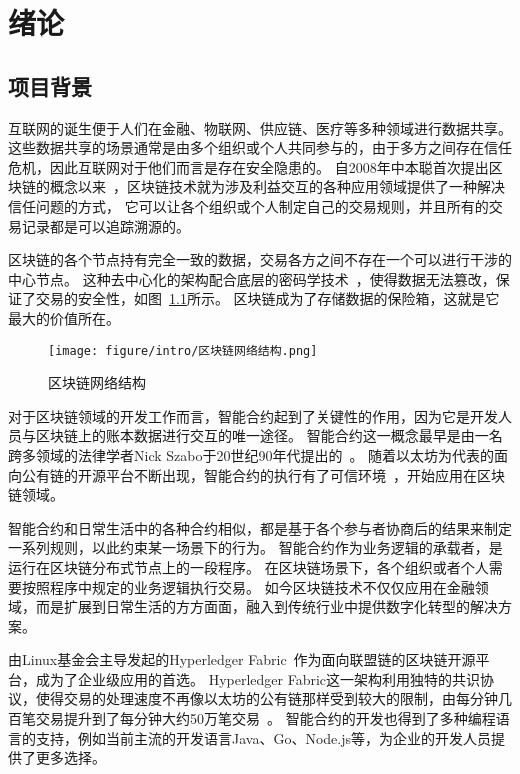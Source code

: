 \chapter{绪论}

\section{项目背景}

互联网的诞生便于人们在金融、物联网、供应链、医疗等多种领域进行数据共享。
这些数据共享的场景通常是由多个组织或个人共同参与的，由于多方之间存在信任危机，因此互联网对于他们而言是存在安全隐患的。
自2008年中本聪首次提出区块链的概念以来~\cite{Bitcoin}，区块链技术就为涉及利益交互的各种应用领域提供了一种解决信任问题的方式，
它可以让各个组织或个人制定自己的交易规则，并且所有的交易记录都是可以追踪溯源的。

区块链的各个节点持有完全一致的数据，交易各方之间不存在一个可以进行干涉的中心节点。
这种去中心化的架构配合底层的密码学技术~\cite{2016区块链技术发展现状与展望}，使得数据无法篡改，保证了交易的安全性，如图~\ref{fig:1.1}所示。
区块链成为了存储数据的保险箱，这就是它最大的价值所在。

\begin{figure}[htb]
  \centering
  \texttt{[image: figure/intro/区块链网络结构.png]}
  \caption{区块链网络结构}\label{fig:1.1}
\end{figure}

对于区块链领域的开发工作而言，智能合约起到了关键性的作用，因为它是开发人员与区块链上的账本数据进行交互的唯一途径。
智能合约这一概念最早是由一名跨多领域的法律学者Nick Szabo于20世纪90年代提出的~\cite{王春宇2016智能合约与金融合约}。
随着以太坊为代表的面向公有链的开源平台不断出现，智能合约的执行有了可信环境~\cite{QianYang}，开始应用在区块链领域。

智能合约和日常生活中的各种合约相似，都是基于各个参与者协商后的结果来制定一系列规则，以此约束某一场景下的行为。
智能合约作为业务逻辑的承载者，是运行在区块链分布式节点上的一段程序。
在区块链场景下，各个组织或者个人需要按照程序中规定的业务逻辑执行交易。
如今区块链技术不仅仅应用在金融领域，而是扩展到日常生活的方方面面，融入到传统行业中提供数字化转型的解决方案。

由Linux基金会主导发起的Hyperledger Fabric~\cite{Dhillon}作为面向联盟链的区块链开源平台，成为了企业级应用的首选。
Hyperledger Fabric这一架构利用独特的共识协议，使得交易的处理速度不再像以太坊的公有链那样受到较大的限制，由每分钟几百笔交易提升到了每分钟大约50万笔交易~\cite{DBLP:journals/access/PinnaIBTM19}。
智能合约的开发也得到了多种编程语言的支持，例如当前主流的开发语言Java、Go、Node.js等，为企业的开发人员提供了更多选择。

